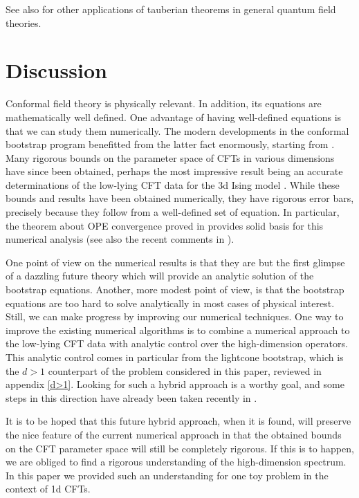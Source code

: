 \documentclass[12pt]{article}
\numberwithin{equation}{section}
\begin{document}
See also \cite{Vladimirov:1978xx} for other applications of tauberian theorems in general quantum field theories.

\section{Discussion}

Conformal field theory is physically relevant. In addition, its equations are mathematically well defined. 
One advantage of having well-defined equations is that we can study them numerically. The modern developments in the conformal bootstrap program benefitted from the latter fact enormously, starting from \cite{Rattazzi:2008pe}. Many rigorous bounds on the parameter space of CFTs in various dimensions have since been obtained, perhaps the most impressive result being an accurate determinations of the low-lying CFT data for the 3d Ising model \cite{ElShowk:2012ht,El-Showk:2014dwa,Kos:2014bka,Simmons-Duffin:2015qma,Kos:2016ysd,Simmons-Duffin:2016wlq}. While these bounds and results have been obtained numerically, they have rigorous error bars, precisely because they follow from a well-defined set of equation. In particular, the theorem about OPE convergence proved in \cite{Pappadopulo:2012jk} provides solid basis for this numerical analysis (see also the recent comments in \cite{Rychkov:2017tpc}).

One point of view on the numerical results is that they are but the first glimpse of a dazzling future theory which will provide an analytic solution of the bootstrap equations. Another, more modest point of view, is that the bootstrap equations are too hard to solve analytically in most cases of physical interest. Still, we can make progress by improving our numerical techniques. One way to improve the existing numerical algorithms is to combine a numerical approach to the low-lying 
CFT data with analytic control over the high-dimension operators. This analytic control comes in particular from the lightcone bootstrap, which is the $d>1$ counterpart of the problem considered in this paper, reviewed in appendix \ref{d>1}. Looking for such a hybrid approach is a worthy goal, and some steps in this direction have already been taken recently in \cite{Simmons-Duffin:2016wlq,Caron-Huot:2017vep}. 

It is to be hoped that this future hybrid approach, when it is found, will preserve the nice feature of the current numerical approach in that the obtained bounds on the CFT parameter space will still be completely rigorous. If this is to happen, we are obliged to find a rigorous understanding of the high-dimension spectrum. In this paper we provided such an understanding for one toy problem in the context of 1d CFTs. 
\end{document}
